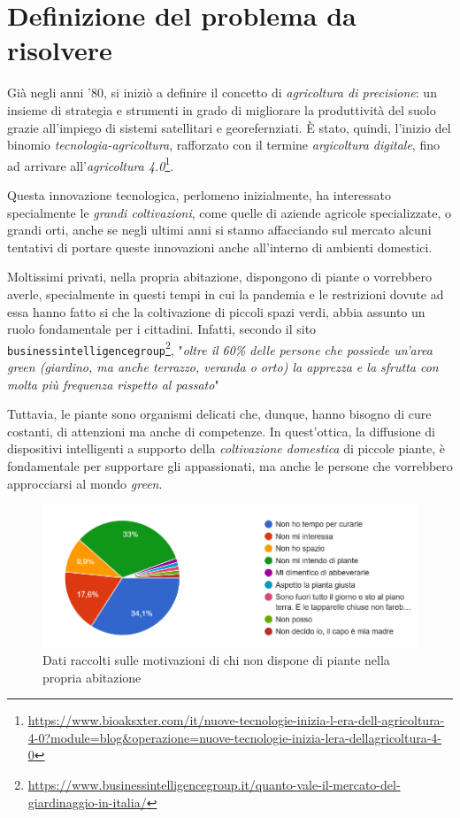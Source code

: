 \section{Definizione del problema da risolvere}

Già negli anni '80, si iniziò a definire il concetto di \textit{agricoltura di precisione}: un insieme di strategia e strumenti in grado di migliorare la produttività del suolo grazie all'impiego di sistemi satellitari e georefernziati. \`E stato, quindi, l'inizio del binomio \textit{tecnologia-agricoltura}, rafforzato con il termine \textit{argicoltura digitale}, fino ad arrivare all'\textit{agricoltura 4.0}\footnote{\url{https://www.bioaksxter.com/it/nuove-tecnologie-inizia-l-era-dell-agricoltura-4-0?module=blog&operazione=nuove-tecnologie-inizia-lera-dellagricoltura-4-0}}.

Questa innovazione tecnologica, perlomeno inizialmente, ha interessato specialmente le \textit{grandi coltivazioni}, come quelle di aziende agricole specializzate, o grandi orti, anche se negli ultimi anni si stanno affacciando sul mercato alcuni tentativi di portare queste innovazioni anche all'interno di ambienti domestici.

Moltissimi privati, nella propria abitazione, dispongono di piante o vorrebbero averle, specialmente in questi tempi in cui la pandemia e le restrizioni dovute ad essa hanno fatto si che la coltivazione di piccoli spazi verdi, abbia assunto un ruolo fondamentale per i cittadini. Infatti, secondo il sito \texttt{businessintelligencegroup}\footnote{\url{https://www.businessintelligencegroup.it/quanto-vale-il-mercato-del-giardinaggio-in-italia/}}, "\textit{oltre il 60\% delle persone che possiede un’area green (giardino, ma anche terrazzo, veranda o orto) la apprezza e la sfrutta con molta più frequenza rispetto al passato}"

Tuttavia, le piante sono organismi delicati che, dunque, hanno bisogno di cure costanti, di attenzioni ma anche di competenze. In quest'ottica, la diffusione di dispositivi intelligenti a supporto della \textit{coltivazione domestica} di piccole piante, è fondamentale per supportare gli appassionati, ma anche le persone che vorrebbero approcciarsi al mondo \textit{green}.

\begin{figure}[h!]
	\centering
	\includegraphics[width=\columnwidth]{images/torta_perche_no_piante.png}
	\caption{Dati raccolti sulle motivazioni di chi non dispone di piante nella propria abitazione}
	\label{fig:whynot}
\end{figure}

